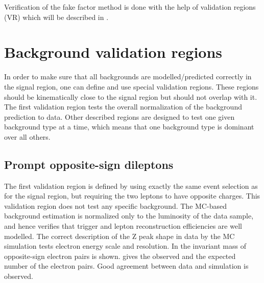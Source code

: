 Verification of the fake factor method is done with the help of validation regions (VR) which will be described in .



\section{Background validation regions}
\label{sec:bkg_validation}

In order to make sure that all backgrounds are modelled/predicted correctly in the signal region, one can define and use special validation regions.
These regions should be kinematically close to the signal region but should not overlap with it. 
The first validation region tests the overall normalization of the background prediction to data.
Other described regions are designed to test one given background type at a time, which means that one background type is dominant over all others.

\subsection{Prompt opposite-sign dileptons}

The first validation region is defined by using exactly the same event selection as for the signal region,
but requiring the two leptons to have opposite charges. 
This validation region does not test any specific background.
The MC-based background estimation is normalized only to the luminosity of the data sample, and hence verifies that trigger and lepton reconstruction efficiencies are well modelled.
The correct description of the Z peak shape in data by the MC simulation tests electron energy scale and resolution.
In  the invariant mass of opposite-sign electron pairs is shown.
 gives the observed and the expected number of the electron pairs.
Good agreement between data and simulation is observed.

